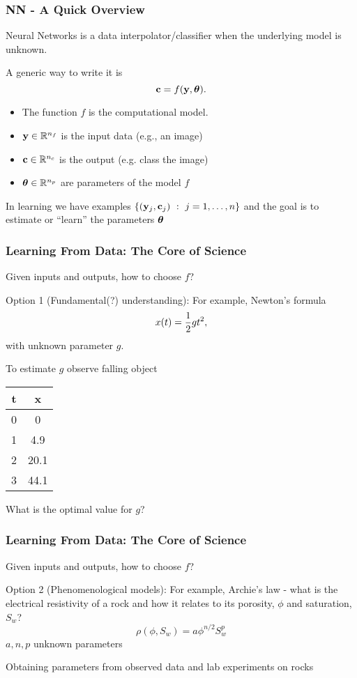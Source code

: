 \documentclass[12pt,fleqn]{beamer}
\begin{document}
\begin{frame}\frametitle{NN - A Quick Overview}

Neural Networks is a data interpolator/classifier when the underlying model
is unknown.

\bigskip

A generic way to write it is
$$ {\bf c} = f({\bf y},{\boldsymbol \theta}). $$


\begin{itemize}
\item The function $f$ is the computational model.
\item ${\bf y}\in\mathbb{R}^{n_f}$ is the input data (e.g., an image)
\item ${\bf c}\in\mathbb{R}^{n_c}$ is the output (e.g. class the image)
\item ${\boldsymbol \theta}\in\mathbb{R}^{n_p}$ are parameters of the model $f$
\end{itemize}

In learning we have examples $\{({\bf y}_j,{\bf c}_j) \ : \ j=1,\ldots,n\}$ and the goal
is to estimate or ``learn'' the parameters ${\boldsymbol \theta}$

\end{frame}


\begin{frame}\frametitle{Learning From Data: The Core of Science}


Given inputs and outputs, how to choose $f$?

\bigskip

Option 1 (Fundamental(?) understanding): For example, Newton's formula
$$ x(t) = {\frac 12} g t^2, $$
with unknown parameter $g$. 

\pause

To estimate $g$ observe falling object
\begin{center}
\begin{tabular}{cc}
t   &  x \\ \hline
0  &  0  \\
1  & 4.9  \\
2  & 20.1 \\
3  & 44.1 \\
\end{tabular}
\end{center}
What is the optimal value for $g$?




\end{frame}


\begin{frame}\frametitle{Learning From Data: The Core of Science}



Given inputs and outputs, how to choose $f$?

\bigskip

Option 2 (Phenomenological models): For example, Archie's law - what is the electrical resistivity of a rock
 and how it relates to its porosity, $\phi$ and saturation, $S_w$?
$$ \rho(\phi,S_w) = a \phi^{n/2} S_w^p $$
$a,n,p$ unknown parameters


\bigskip

Obtaining parameters from observed data and lab experiments on rocks


\end{frame}
\end{document}
